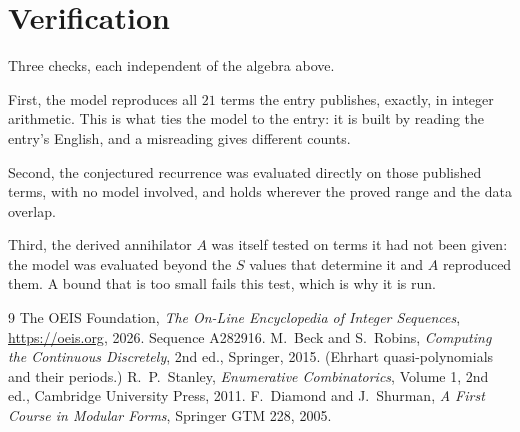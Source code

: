 \documentclass[11pt,a4paper]{article}
\theoremstyle{plain}
\theoremstyle{definition}
\begin{document}
\section{Verification}

Three checks, each independent of the algebra above.

First, the model reproduces all $21$ terms the entry publishes, exactly, in integer
arithmetic. This is what ties the model to the entry: it is built by reading the entry's
English, and a misreading gives different counts.

Second, the conjectured recurrence was evaluated directly on those published terms, with no
model involved, and holds wherever the proved range and the data overlap.

Third, the derived annihilator $A$ was itself tested on terms it had not been given: the model
was evaluated beyond the $S$ values that determine it and $A$ reproduced them. A bound that is
too small fails this test, which is why it is run.

\begin{thebibliography}{9}
 The OEIS Foundation, \emph{The On-Line Encyclopedia of Integer
Sequences}, \url{https://oeis.org}, 2026. Sequence A282916.
 M.~Beck and S.~Robins, \emph{Computing the Continuous Discretely},
2nd ed., Springer, 2015. (Ehrhart quasi-polynomials and their periods.)
 R.~P.~Stanley, \emph{Enumerative Combinatorics}, Volume 1, 2nd ed.,
Cambridge University Press, 2011.
 F.~Diamond and J.~Shurman, \emph{A First Course in Modular Forms},
Springer GTM 228, 2005.
\end{thebibliography}
\end{document}
